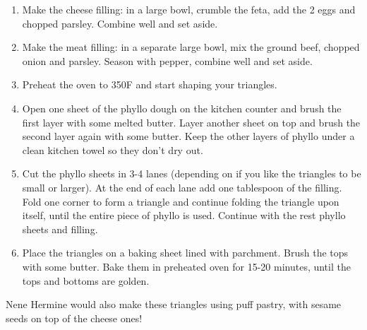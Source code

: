 \begin{enumerate}
    \item Make the cheese filling: in a large bowl, crumble the feta, add the 2 eggs and chopped parsley. Combine well and set aside.
    \item Make the meat filling: in a separate large bowl, mix the ground beef, chopped onion and parsley. Season with pepper, combine well and set aside.
    \item Preheat the oven to 350\degree F and start shaping your triangles.
    \item Open one sheet of the phyllo dough on the kitchen counter and brush the first layer with some melted butter. Layer another sheet on top and brush the second layer again with some butter. Keep the other layers of phyllo under a clean kitchen towel so they don't dry out.
    \item Cut the phyllo sheets in 3-4 lanes (depending on if you like the triangles to be small or larger). At the end of each lane add one tablespoon of the filling. Fold one corner to form a triangle and continue folding the triangle upon itself, until the entire piece of phyllo is used. Continue with the rest phyllo sheets and filling.
    \item Place the triangles on a baking sheet lined with parchment. Brush the tops with some butter. Bake them in preheated oven for 15-20 minutes, until the tops and bottoms are golden.
\end{enumerate}

Nene Hermine would also make these triangles using puff pastry, with sesame seeds on top of the cheese ones!
